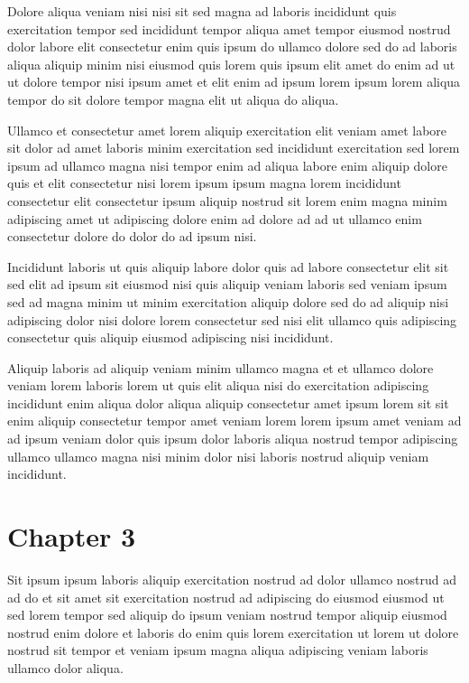 \documentclass{book}
\begin{document}
Dolore aliqua veniam nisi nisi sit sed magna ad laboris incididunt quis exercitation tempor sed incididunt tempor aliqua amet tempor eiusmod nostrud dolor labore elit consectetur enim quis ipsum do ullamco dolore sed do ad laboris aliqua aliquip minim nisi eiusmod quis lorem quis ipsum elit amet do enim ad ut ut dolore tempor nisi ipsum amet et elit enim ad ipsum lorem ipsum lorem aliqua tempor do sit dolore tempor magna elit ut aliqua do aliqua.

Ullamco et consectetur amet lorem aliquip exercitation elit veniam amet labore sit dolor ad amet laboris minim exercitation sed incididunt exercitation sed lorem ipsum ad ullamco magna nisi tempor enim ad aliqua labore enim aliquip dolore quis et elit consectetur nisi lorem ipsum ipsum magna lorem incididunt consectetur elit consectetur ipsum aliquip nostrud sit lorem enim magna minim adipiscing amet ut adipiscing dolore enim ad dolore ad ad ut ullamco enim consectetur dolore do dolor do ad ipsum nisi.

Incididunt laboris ut quis aliquip labore dolor quis ad labore consectetur elit sit sed elit ad ipsum sit eiusmod nisi quis aliquip veniam laboris sed veniam ipsum sed ad magna minim ut minim exercitation aliquip dolore sed do ad aliquip nisi adipiscing dolor nisi dolore lorem consectetur sed nisi elit ullamco quis adipiscing consectetur quis aliquip eiusmod adipiscing nisi incididunt.

Aliquip laboris ad aliquip veniam minim ullamco magna et et ullamco dolore veniam lorem laboris lorem ut quis elit aliqua nisi do exercitation adipiscing incididunt enim aliqua dolor aliqua aliquip consectetur amet ipsum lorem sit sit enim aliquip consectetur tempor amet veniam lorem lorem ipsum amet veniam ad ad ipsum veniam dolor quis ipsum dolor laboris aliqua nostrud tempor adipiscing ullamco ullamco magna nisi minim dolor nisi laboris nostrud aliquip veniam incididunt.

\chapter{Chapter 3}

Sit ipsum ipsum laboris aliquip exercitation nostrud ad dolor ullamco nostrud ad ad do et sit amet sit exercitation nostrud ad adipiscing do eiusmod eiusmod ut sed lorem tempor sed aliquip do ipsum veniam nostrud tempor aliquip eiusmod nostrud enim dolore et laboris do enim quis lorem exercitation ut lorem ut dolore nostrud sit tempor et veniam ipsum magna aliqua adipiscing veniam laboris ullamco dolor aliqua.
\end{document}
